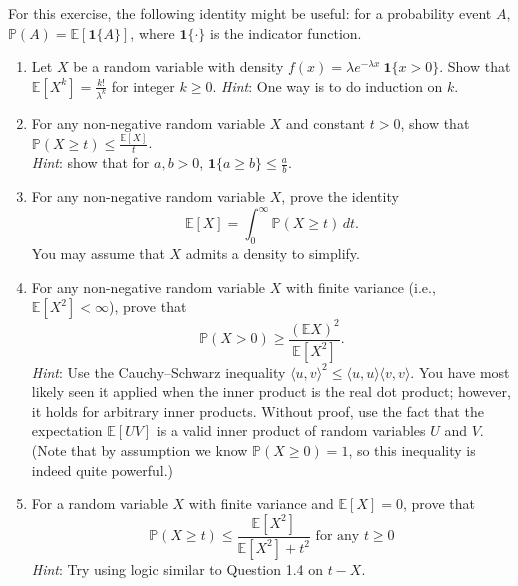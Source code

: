 \documentclass[11pt]{article}
\begin{document}
\pagebreak



 For this exercise, the following identity might be useful: for a probability event $A$, $\mathbb{P}(A) = \mathbb{E}[\mathbf{1}\{A\}]$, where $\mathbf{1}\{\cdot\}$ is the indicator function.
\begin{enumerate}
	\item Let $X$ be a random variable with density 
	$f(x)=\lambda e^{-\lambda x}\ \mathbf{1}\{x > 0\}$.
	Show that $\mathbb{E}[X^k] = \frac{k!}{\lambda^k}$ for integer $k \geq 0$.
	\emph{Hint}: One way is to do induction on $k$.
	
	\item For any non-negative random variable $X$ and constant $t > 0$, show that $\mathbb{P}(X \geq t) \leq \frac{\mathbb{E}[X]}{t}$.\\
	\emph{Hint}: show that for $a, b > 0$, $\mathbf{1}\{a \geq b\} \leq \frac{a}{b}$.
    
    

    \item For any non-negative random variable $X$, prove the identity
    $$\mathbb{E} [X] = \int_{0}^\infty \mathbb{P}(X\geq t) \, dt.$$
    You may assume that $X$ admits a density to simplify.
    
    
    \item For any non-negative random variable $X$ with finite variance  (i.e., $\mathbb{E}[X^2]<\infty$), prove that
    $$\mathbb{P}(X> 0)\geq \frac{(\mathbb{E} X)^2}{\mathbb{E} [X^2]}.$$
    \emph{Hint}: Use the Cauchy--Schwarz inequality $\langle u,v\rangle^2\leq \langle u,u\rangle \langle v,v\rangle$. You have most likely seen it applied when the inner product is the real dot product; however, it holds for arbitrary inner products. 
    Without proof, use the fact that the expectation $\mathbb{E}[UV]$ is a valid inner product of random variables $U$ and $V$.  \\
    (Note that by assumption we know $\mathbb{P}(X\geq 0)=1$, so this inequality is indeed quite powerful.)
    
    

    \item For a random variable $X$ with finite variance and $\mathbb{E}[X] = 0$, prove that 
    $$\mathbb{P}(X \geq t) \leq \frac{\mathbb{E}[X^2]}{\mathbb{E}[X^2]+t^2} \text{ for any } t\geq 0$$
    \emph{Hint}: Try using logic similar to Question 1.4 on $t-X$.
    
    

\end{enumerate}
\end{document}
